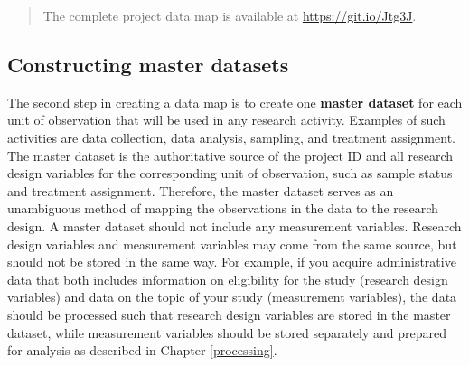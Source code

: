 \documentclass[
]{book}
\begin{document}
\begin{ex}
\begin{quote}
The complete project data map is available at \url{https://git.io/Jtg3J}.
\end{quote}
\end{ex}

\hypertarget{constructing-master-datasets}{%
\subsection*{Constructing master datasets}\label{constructing-master-datasets}}

The second step in creating a data map is to create one \textbf{master dataset}
for each unit of observation that will be used in any research activity.
Examples of such activities are data collection, data analysis,
sampling, and treatment assignment.
The master dataset is the authoritative source
of the project ID and all research design variables
for the corresponding unit of observation,
such as sample status and treatment assignment.
Therefore, the master dataset serves as an unambiguous method of mapping
the observations in the data to the research design.
A master dataset should not include any measurement variables.
Research design variables and measurement variables
may come from the same source,
but should not be stored in the same way.
For example, if you acquire administrative data that both includes
information on eligibility for the study (research design variables)
and data on the topic of your study (measurement variables),
the data should be processed such that research design variables are stored in the master dataset,
while measurement variables should be stored separately and prepared for analysis
as described in Chapter \ref{processing}.
\end{document}
